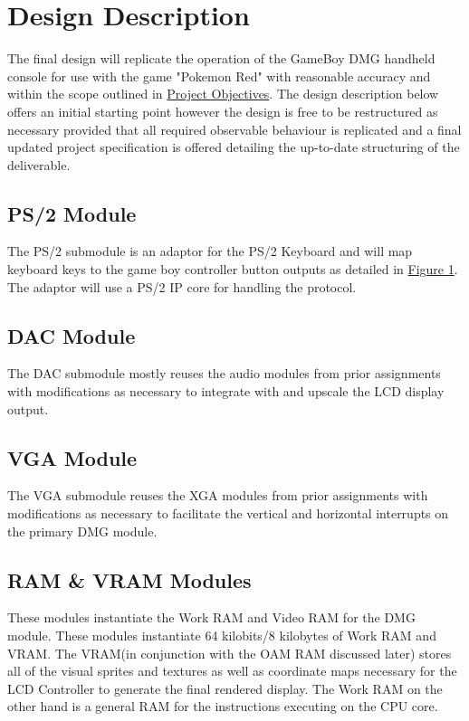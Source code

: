 \documentclass[12pt,letterpaper,titlepage, final]{report}
\begin{document}
\begin{raggedright}
\clearpage

\hypertarget{desdesc}{\section{Design Description}}

The final design will replicate the operation of the GameBoy DMG handheld console for use with the game "Pokemon Red" with reasonable accuracy and within the scope outlined in \hyperlink{projobj}{Project Objectives}. The design description below offers an initial starting point however the design is free to be restructured as necessary provided that all required observable behaviour is replicated and a final updated project specification is offered detailing the up-to-date structuring of the deliverable.

\subsection{PS/2 Module}

The PS/2 submodule is an adaptor for the PS/2 Keyboard and will map keyboard keys to the game boy controller button outputs as detailed in \hyperlink{fig1}{Figure 1}. The adaptor will use a PS/2 IP core for handling the protocol.

\subsection{DAC Module}

The DAC submodule mostly reuses the audio modules from prior assignments with modifications as necessary to integrate with and upscale the LCD display output.

\subsection{VGA Module}

The VGA submodule reuses the XGA modules from prior assignments with modifications as necessary to facilitate the vertical and horizontal interrupts on the primary DMG module.

\subsection{RAM \& VRAM Modules}

These modules instantiate the Work RAM and Video RAM for the DMG module. These modules instantiate 64 kilobits/8 kilobytes of Work RAM and VRAM. The VRAM(in conjunction with the OAM RAM discussed later) stores all of the visual sprites and textures as well as coordinate maps necessary for the LCD Controller to generate the final rendered display. The Work RAM on the other hand is a general RAM for the instructions executing on the CPU core.


\end{raggedright}
\end{document}

